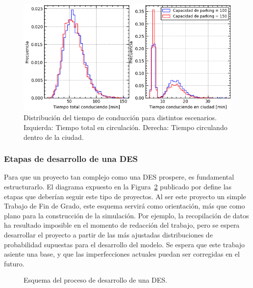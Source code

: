 \begin{figure}[H]
	\begin{center}
		\includegraphics[width=\textwidth]{fig/2_fig_example_03}
	\end{center}
	\caption{Distribución del tiempo de conducción para distintos escenarios. Izquierda: Tiempo total en circulación. Derecha: Tiempo circulando dentro de la ciudad.}
	\label{fig:2_fig_example_03}
\end{figure}

\subsubsection{Etapas de desarrollo de una DES}

Para que un proyecto tan complejo como una DES prospere, es fundamental estructurarlo.
El diagrama expuesto en la Figura~\ref{fig:2_fc_sim_cookbook}
publicado por \citet{banks1998handbook}
define las etapas que deberían seguir este tipo de proyectos.
Al ser este proyecto un simple Trabajo de Fin de Grado,
este esquema servirá como orientación, más que como plano para la construcción de la simulación.
Por ejemplo, la recopilación de datos ha resultado imposible en el momento de redacción del trabajo,
pero se espera desarrollar el proyecto
a partir de las más ajustadas distribuciones de probabilidad supuestas
para el desarrollo del modelo.
Se espera que este trabajo asiente una base,
y que las imperfecciones actuales puedan ser corregidas en el futuro.

\begin{figure}
	\begin{center}
		
	\end{center}
	\caption{Esquema del proceso de desarrollo de una DES.}
	\label{fig:2_fc_sim_cookbook}
\end{figure}

